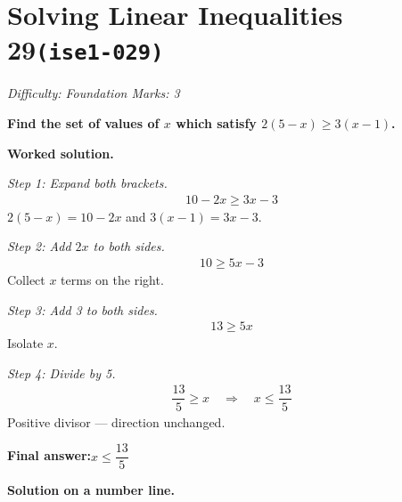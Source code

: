 \documentclass[11pt]{article}
\newcommand{\question}[1]{\par\medskip\noindent\textbf{#1}\par}
\begin{document}
\section*{Solving Linear Inequalities 29\quad\small\texttt{(ise1-029)}}
\textit{Difficulty: Foundation \quad\textbar\quad Marks: 3}

\question{Find the set of values of \( x \) which satisfy \( 2(5 - x) \geq 3(x - 1) \).}

\textbf{Worked solution.}

\textit{Step 1: Expand both brackets.}
\[\begin{gathered}
10 - 2x \geq 3x - 3
\end{gathered}\]
\( 2(5-x) = 10 - 2x \) and \( 3(x-1) = 3x - 3 \).

\textit{Step 2: Add \( 2x \) to both sides.}
\[\begin{gathered}
10 \geq 5x - 3
\end{gathered}\]
Collect \( x \) terms on the right.

\textit{Step 3: Add 3 to both sides.}
\[\begin{gathered}
13 \geq 5x
\end{gathered}\]
Isolate \( x \).

\textit{Step 4: Divide by 5.}
\[\begin{gathered}
\dfrac{13}{5} \geq x \quad \Rightarrow \quad x \leq \dfrac{13}{5}
\end{gathered}\]
Positive divisor --- direction unchanged.

\begin{answerbox}
\textbf{Final answer:}\quad \(\displaystyle  x \leq \dfrac{13}{5} \)
\end{answerbox}
\textbf{Solution on a number line.}
\end{document}
